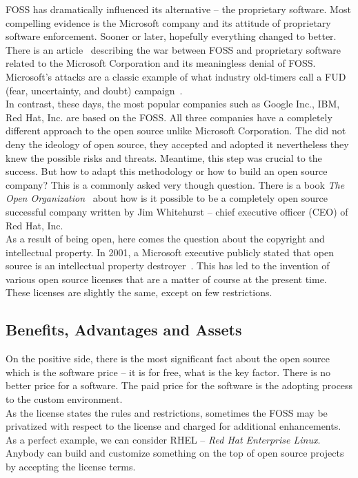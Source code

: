 \documentclass[12pt,a4paper]{article}
\theoremstyle{definition}
\begin{document}
    FOSS has dramatically influenced its alternative -- the proprietary software. Most compelling evidence is the Microsoft company and its attitude of proprietary software enforcement. Sooner or later, hopefully everything changed to better. There is an article~\cite{938720} describing the war between FOSS and proprietary software related to the Microsoft Corporation and its meaningless denial of FOSS. Microsoft's attacks are a classic example of what industry old-timers call a FUD (fear, uncertainty, and doubt) campaign~\cite{938720}.\\

    In contrast, these days, the most popular companies such as Google Inc., IBM, Red Hat, Inc. are based on the FOSS. All three companies have a completely different approach to the open source unlike Microsoft Corporation. The did not deny the ideology of open source, they accepted and adopted it nevertheless they knew the possible risks and threats. Meantime, this step was crucial to the success. But how to adapt this methodology or how to build an open source company? This is a commonly asked very though question. There is a book \textit{The Open Organization}~\cite{whitehurst2015open} about how is it possible to be a completely open source successful company written by Jim Whitehurst -- chief executive officer (CEO) of Red Hat, Inc.\\

    As a result of being open, here comes the question about the copyright and intellectual property. In 2001, a Microsoft executive publicly stated that open source is an intellectual property destroyer~\cite{5662568}. This has led to the invention of various open source licenses that are a matter of course at the present time. These licenses are slightly the same, except on few restrictions.

    \subsection{Benefits, Advantages and Assets}\label{FOSS:pros}

        On the positive side, there is the most significant fact about the open source which is the software price -- it is for free, what is the key factor. There is no better price for a software. The paid price for the software is the adopting process to the custom environment.\\

        As the license states the rules and restrictions, sometimes the FOSS may be privatized with respect to the license and charged for additional enhancements. As a perfect example, we can consider RHEL -- \textit{Red Hat Enterprise Linux}. Anybody can build and customize something on the top of open source projects by accepting the license terms.\\
\end{document}

